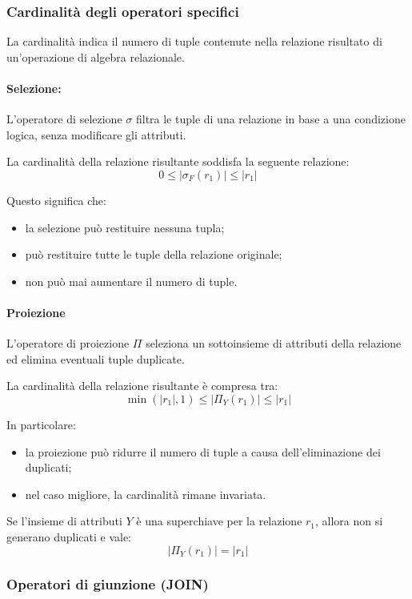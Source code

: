 \subsubsection{Cardinalità degli operatori specifici}

La cardinalità indica il numero di tuple contenute nella relazione risultato di un'operazione di algebra relazionale.

\paragraph{Selezione:}
L'operatore di selezione $\sigma$ filtra le tuple di una relazione in base a una condizione logica, senza modificare gli attributi.

La cardinalità della relazione risultante soddisfa la seguente relazione:
\[
0 \le |\sigma_F(r_1)| \le |r_1|
\]

Questo significa che:
\begin{itemize}
	\item la selezione può restituire nessuna tupla;
	\item può restituire tutte le tuple della relazione originale;
	\item non può mai aumentare il numero di tuple.
\end{itemize}

\paragraph{Proiezione}
L'operatore di proiezione $\Pi$ seleziona un sottoinsieme di attributi della relazione ed elimina eventuali tuple duplicate.

La cardinalità della relazione risultante è compresa tra:
\[
\min(|r_1|, 1) \le |\Pi_Y(r_1)| \le |r_1|
\]

In particolare:
\begin{itemize}
	\item la proiezione può ridurre il numero di tuple a causa dell'eliminazione dei duplicati;
	\item nel caso migliore, la cardinalità rimane invariata.
\end{itemize}

Se l'insieme di attributi $Y$ è una superchiave per la relazione $r_1$, allora non si generano duplicati e vale:
\[
|\Pi_Y(r_1)| = |r_1|
\]

\subsubsection{Operatori di giunzione (JOIN)}

